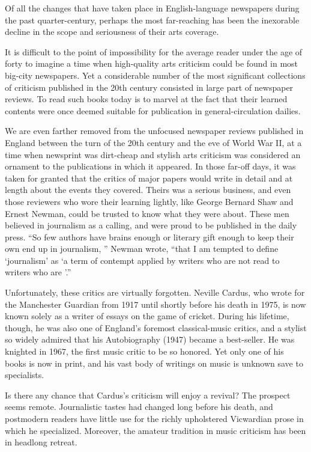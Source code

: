 Of all the changes that have taken place in English-language newspapers during the past quarter-century, perhaps the most far-reaching has been the inexorable decline in the scope and seriousness of their arts coverage.


It is difficult to the point of impossibility for the average reader under the age of forty to imagine a time when high-quality arts criticism could be found in most big-city newspapers. Yet a considerable number of the most significant collections of criticism published in the 20th century consisted in large part of newspaper reviews. To read such books today is to marvel at the fact that their learned contents were once deemed suitable for publication in general-circulation dailies.


We are even farther removed from the unfocused newspaper reviews published in England between the turn of the 20th century and the eve of World War II, at a time when newsprint was dirt-cheap and stylish arts criticism was considered an ornament to the publications in which it appeared. In those far-off days, it was taken for granted that the critics of major papers would write in detail and at length about the events they covered. Theirs was a serious business, and even those reviewers who wore their learning lightly, like George Bernard Shaw and Ernest Newman, could be trusted to know what they were about. These men believed in journalism as a calling, and were proud to be published in the daily press. ``So few authors have brains enough or literary gift enough to keep their own end up in journalism, '' Newman wrote, ``that I am tempted to define `journalism' as `a term of contempt applied by writers who are not read to writers who are '.''


Unfortunately, these critics are virtually forgotten. Neville Cardus, who wrote for the Manchester Guardian from 1917 until shortly before his death in 1975, is now known solely as a writer of essays on the game of cricket. During his lifetime, though, he was also one of England's foremost classical-music critics, and a stylist so widely admired that his Autobiography (1947) became a best-seller. He was knighted in 1967, the first music critic to be so honored. Yet only one of his books is now in print, and his vast body of writings on music is unknown save to specialists.


Is there any chance that Cardus's criticism will enjoy a revival? The prospect seems remote. Journalistic tastes had changed long before his death, and postmodern readers have little use for the richly upholstered Vicwardian prose in which he specialized. Moreover, the amateur tradition in music criticism has been in headlong retreat.